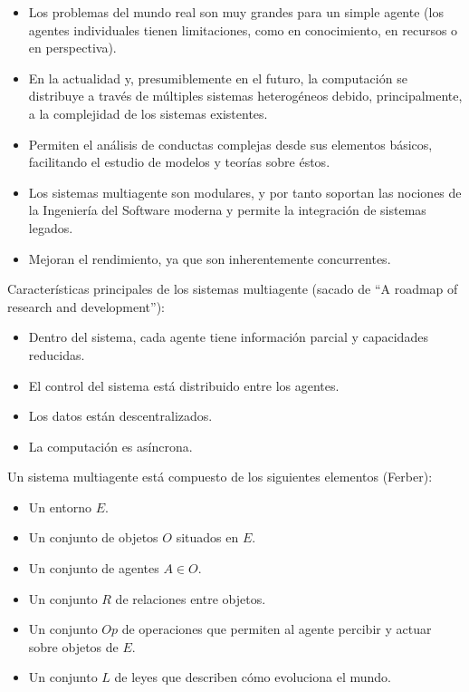 \begin{itemize}
	\item Los problemas del mundo real son muy grandes para un simple agente (los agentes individuales tienen limitaciones, como en conocimiento, en recursos o en perspectiva).
	\item En la actualidad y, presumiblemente en el futuro, la computación se distribuye a través de múltiples sistemas heterogéneos debido, principalmente, a la complejidad de los sistemas existentes.
	\item Permiten el análisis de conductas complejas desde sus elementos básicos, facilitando el estudio de modelos y teorías sobre éstos.
	\item Los sistemas multiagente son modulares, y por tanto soportan las nociones de la Ingeniería del Software moderna y permite la integración de sistemas legados.
	\item Mejoran el rendimiento, ya que son inherentemente concurrentes.
\end{itemize}

Características principales de los sistemas multiagente (sacado de \enquote{A roadmap of research and development}):

\begin{itemize}
	\item Dentro del sistema, cada agente tiene información parcial y capacidades reducidas.
	\item El control del sistema está distribuido entre los agentes.
	\item Los datos están descentralizados.
	\item La computación es asíncrona.
\end{itemize}

Un sistema multiagente está compuesto de los siguientes elementos (Ferber):

\begin{itemize}
	\item Un entorno $E$.
	\item Un conjunto de objetos $O$ situados en $E$.
	\item Un conjunto de agentes $A \in O$.
	\item Un conjunto $R$ de relaciones entre objetos.
	\item Un conjunto $Op$ de operaciones que permiten al agente percibir y actuar sobre objetos de $E$.
	\item Un conjunto $L$ de leyes que describen cómo evoluciona el mundo.
\end{itemize}